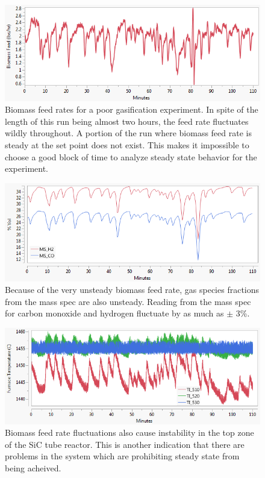 \documentclass[11pt]{article}
\begin{document}
\begin{figure}[H]
    \centering
    \includegraphics[width = \textwidth]{bm_bad.png}
    \caption{Biomass feed rates for a poor gasification experiment.  In spite of the length of this run being almost two hours, the feed rate fluctuates wildly throughout.  A portion of the run where biomass feed rate is steady at the set point does not exist.  This makes it impossible to choose a good block of time to analyze steady state behavior for the experiment.}
    \label{bm_bad}
\end{figure}

\begin{figure}[H]
    \centering
    \includegraphics[width = \textwidth]{gas_bad.png}
    \caption{Because of the very unsteady biomass feed rate, gas species fractions from the mass spec are also unsteady.  Reading from the mass spec for carbon monoxide and hydrogen fluctuate by as much as $\pm$ 3\%.}
    \label{gas_bad}
\end{figure}

\begin{figure}[H]
    \centering
    \includegraphics[width = \textwidth]{temp_bad.png}
    \caption{Biomass feed rate fluctuations also cause instability in the top zone of the SiC tube reactor.  This is another indication that there are problems in the system which are prohibiting steady state from being acheived.}
    \label{temp_bad}
\end{figure}
\end{document}
